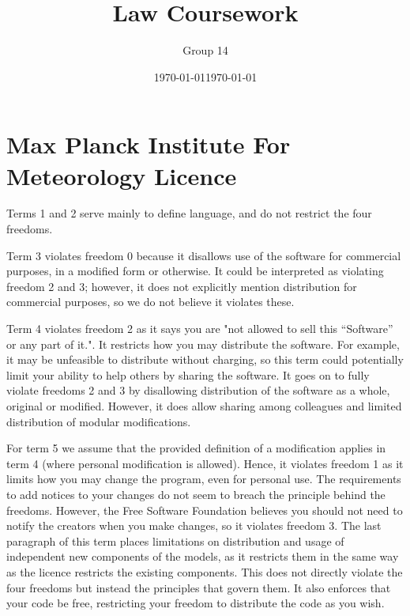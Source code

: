 \documentclass[a4wide, 11pt]{article}
\begin{document}
\title{\vspace{-1cm}Law Coursework}

\author{\vspace{-2cm}Group 14}

\date{\vspace{-2cm}\today}

\date{\today}         %

\maketitle            %

\renewcommand\thesection{\arabic{section}}
\renewcommand\thesubsection{\thesection.\alph{subsection}}

\section{Max Planck Institute For Meteorology Licence}

Terms 1 and 2 serve mainly to define language, and do not restrict the four freedoms.

Term 3 violates freedom 0 because it disallows use of the software for commercial purposes, in a modified form or otherwise. It could be interpreted as violating freedom 2 and 3; however, it does not explicitly mention distribution for commercial purposes, so we do not believe it violates these.

Term 4 violates freedom 2 as it says you are "not allowed to sell this “Software” or any part of it.". It restricts how you may distribute the software. For example, it may be unfeasible to distribute without charging, so this term could potentially limit your ability to help others by sharing the software. It goes on to fully violate freedoms 2 and 3 by disallowing distribution of the software as a whole, original or modified. However, it does allow sharing among colleagues and limited distribution of modular modifications.

For term 5 we assume that the provided definition of a modification applies in term 4 (where personal modification is allowed). Hence, it violates freedom 1 as it limits how you may change the program, even for personal use. The requirements to add notices to your changes do not seem to breach the principle behind the freedoms. However, the Free Software Foundation believes you should not need to notify the creators when you make changes, so it violates freedom 3. The last paragraph of this term places limitations on distribution and usage of independent new components of the models, as it restricts them in the same way as the licence restricts the existing components. This does not directly violate the four freedoms but instead the principles that govern them. It also enforces that your code be free, restricting your freedom to distribute the code as you wish.
\end{document}
